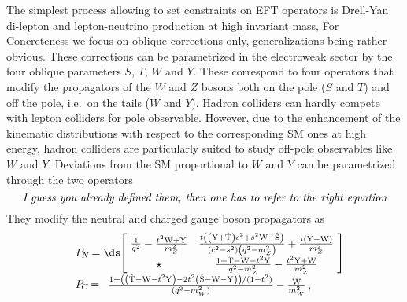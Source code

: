 The simplest process allowing to set constraints on EFT operators is Drell-Yan di-lepton and lepton-neutrino production at high invariant mass, For Concreteness we focus on oblique corrections only, generalizations being rather obvious. These corrections can be parametrized in the electroweak sector by the four oblique parameters $S$, $T$, $W$ and $Y$. These correspond to four operators that modify the propagators of the $W$ and $Z$ bosons both on the pole ($S$ and $T$) and off the pole, i.e.~on the tails ($W$ and $Y$). Hadron colliders can hardly compete with lepton colliders for pole observable. However, due to the enhancement of the kinematic distributions with respect to the corresponding SM ones at high energy, hadron colliders are particularly suited to study off-pole observables like $W$ and $Y$. Deviations from the SM proportional to $W$ and $Y$ can be parametrized through the two operators
\begin{equation}
    \text{\it I guess you already defined them, then one has to refer to the right equation}
\end{equation}
They modify the neutral and charged gauge boson propagators as
\begin{equation}\label{eq:propagators}
\begin{array}{ll}
& P_{\hspace{-1pt}{N}}\hspace{-1pt} = \ds\hspace{-2.5pt}\left[\hspace{-2pt}
\begin{array}{cc}
 \frac{1}{q^2}-\frac{t^{2}{\rm{\sc{W}}}+{\rm{\sc{Y}}}}{m_Z^2} & \frac{t \left(\left({\rm{\sc{Y}}}+{\rm\hat{T}}\right) c^2+s^2 {\rm{\sc{W}}}-{\rm\hat{S}}\right)}{\left(c^2-s^2\right) \left(q^2-m_Z^2\right)}+\frac{t ({\rm{\sc{Y}}}-{\rm{\sc{W}}})}{m_Z^2} \\
 \star & \frac{1+ {\rm\hat{T}}-{\rm{\sc{W}}}-t^{2}{\rm{\sc{Y}}}}{q^2-m_Z^2}-\frac{t^{2}{\rm{\sc{Y}}}+{\rm{\sc{W}}}}{m_Z^2} \\
\end{array}
\hspace{-2pt}
\right] \\
& P_{\hspace{-1pt}{C}}\hspace{-1pt} =
\begin{array}{c}
\frac{1+\left( \left({\rm\hat{T}}-{\rm{\sc{W}}}-t^2 {\rm{\sc{Y}}}\right)-2 t^2 \left({\rm\hat{S}}-{\rm{\sc{W}}}-{\rm{\sc{Y}}}\right)\right)/(1-t^2)}{(q^{2}-m_W^2)}-\frac{{\rm{\sc{W}}}}{m_W^2}\,,
\end{array}
\end{array}
\end{equation}

